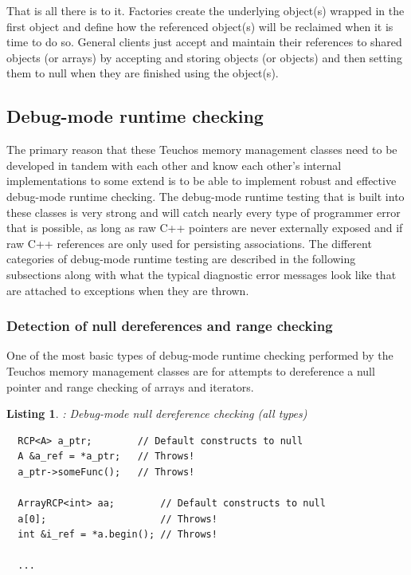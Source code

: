 \documentclass[pdf,ps2pdf,11pt]{SANDreport}
\newtheorem{listing}{Listing}
\begin{document}
That is all there is to it.  Factories create the underlying object(s)
wrapped in the first {} object and define how the referenced
object(s) will be reclaimed when it is time to do so.  General clients
just accept and maintain their references to shared objects (or
arrays) by accepting and storing {} objects (or
{} objects) and then setting them to null when they are
finished using the object(s).


%
{}\subsection{Debug-mode runtime checking}
\label{sec:debug-mode-runtime-checking}
%

The primary reason that these Teuchos memory management classes need
to be developed in tandem with each other and know each other's
internal implementations to some extend is to be able to implement
robust and effective debug-mode runtime checking.  The debug-mode
runtime testing that is built into these classes is very strong and
will catch nearly every type of programmer error that is possible, as
long as raw C++ pointers are never externally exposed and if raw C++
references are only used for persisting associations.  The different
categories of debug-mode runtime testing are described in the
following subsections along with what the typical diagnostic error
messages look like that are attached to exceptions when they are
thrown.


%
{}\subsubsection{Detection of null dereferences and range checking}
\label{sec:null-dereferences-range-checking}
%

One of the most basic types of debug-mode runtime checking performed
by the Teuchos memory management classes are for attempts to
dereference a null pointer and range checking of arrays and iterators.

\begin{listing}: Debug-mode null dereference checking (all types) \\
\label{listing:null-deref}
{\small\begin{verbatim}
  RCP<A> a_ptr;        // Default constructs to null
  A &a_ref = *a_ptr;   // Throws!
  a_ptr->someFunc();   // Throws!

  ArrayRCP<int> aa;        // Default constructs to null
  a[0];                    // Throws!
  int &i_ref = *a.begin(); // Throws!

  ...  
\end{verbatim}}
\end{listing}
\end{document}
